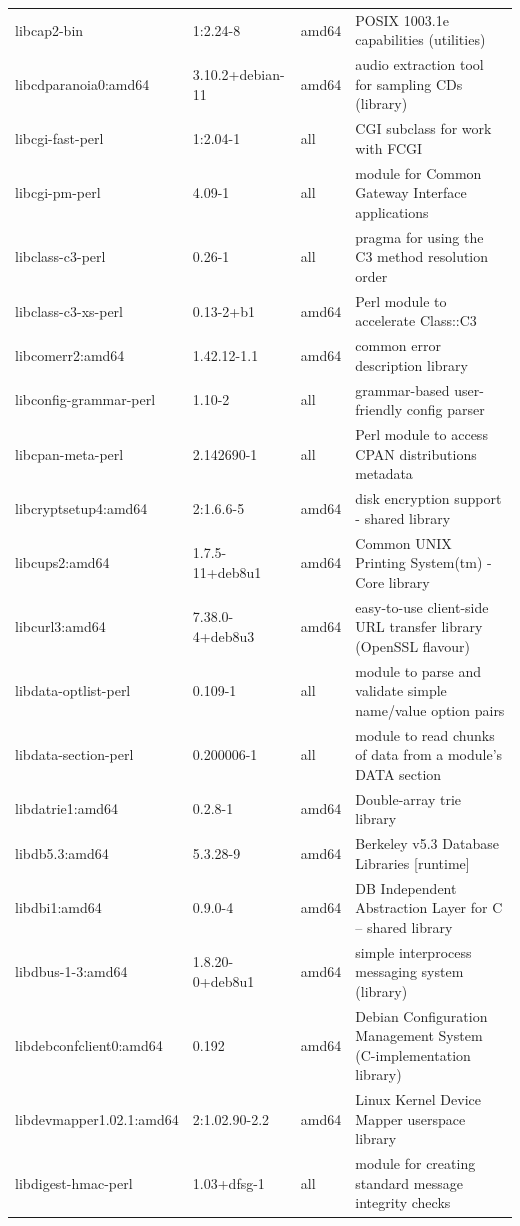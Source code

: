 \documentclass[a4paper,10pt]{article}
\begin{document}
\begin{appendices}
{\begin{longtable}{p{3.25cm}@{\hspace{0.25cm}}p{4cm}@{\hspace{0.25cm}}l@{\hspace{0.25cm}}p{7cm}}
libcap2-bin	&	1:2.24-8	&	amd64	&	POSIX 1003.1e capabilities (utilities)	\\
libcdparanoia0:amd64	&	3.10.2+debian-11	&	amd64	&	audio extraction tool for sampling CDs (library)	\\
libcgi-fast-perl	&	1:2.04-1	&	all	&	CGI subclass for work with FCGI	\\
libcgi-pm-perl	&	4.09-1	&	all	&	module for Common Gateway Interface applications	\\
libclass-c3-perl	&	0.26-1	&	all	&	pragma for using the C3 method resolution order	\\
libclass-c3-xs-perl	&	0.13-2+b1	&	amd64	&	Perl module to accelerate Class::C3	\\
libcomerr2:amd64	&	1.42.12-1.1	&	amd64	&	common error description library	\\
libconfig-grammar-perl	&	1.10-2	&	all	&	grammar-based user-friendly config parser	\\
libcpan-meta-perl	&	2.142690-1	&	all	&	Perl module to access CPAN distributions metadata	\\
libcryptsetup4:amd64	&	2:1.6.6-5	&	amd64	&	disk encryption support - shared library	\\
libcups2:amd64	&	1.7.5-11+deb8u1	&	amd64	&	Common UNIX Printing System(tm) - Core library	\\
libcurl3:amd64	&	7.38.0-4+deb8u3	&	amd64	&	easy-to-use client-side URL transfer library (OpenSSL flavour)	\\
libdata-optlist-perl	&	0.109-1	&	all	&	module to parse and validate simple name/value option pairs	\\
libdata-section-perl	&	0.200006-1	&	all	&	module to read chunks of data from a module's DATA section	\\
libdatrie1:amd64	&	0.2.8-1	&	amd64	&	Double-array trie library	\\
libdb5.3:amd64	&	5.3.28-9	&	amd64	&	Berkeley v5.3 Database Libraries [runtime]	\\
libdbi1:amd64	&	0.9.0-4	&	amd64	&	DB Independent Abstraction Layer for C -- shared library	\\
libdbus-1-3:amd64	&	1.8.20-0+deb8u1	&	amd64	&	simple interprocess messaging system (library)	\\
libdebconfclient0:amd64	&	0.192	&	amd64	&	Debian Configuration Management System (C-implementation library)	\\
libdevmapper1.02.1:amd64	&	2:1.02.90-2.2	&	amd64	&	Linux Kernel Device Mapper userspace library	\\
libdigest-hmac-perl	&	1.03+dfsg-1	&	all	&	module for creating standard message integrity checks	\\

\end{longtable}}
\end{appendices}
\end{document}
